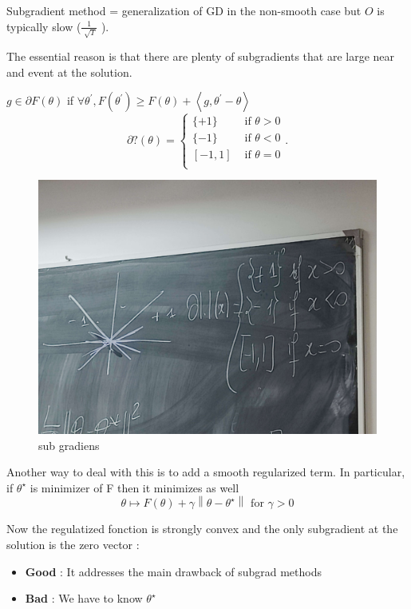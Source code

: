 \begin{note}
    Subgradient method = generalization of GD in the non-smooth case but $ O $ is typically slow ($ \frac{1}{\sqrt[]{T}} $ ). 

    The essential reason is that there are plenty of subgradients that are large near and event at the solution.

    $ g \in \partial F(\theta ) $ if $ \forall \theta ^\prime, F(\theta ^\prime ) \geq F(\theta ) +  \left\langle g, \theta ^\prime - \theta  \right\rangle $ 
    \[
        \partial ? (\theta ) = \begin{cases}
            \{ +1 \}  &\text{ if } \theta > 0\\
            \{ -1 \}  &\text{ if } \theta < 0\\
            [-1 , 1]  &\text{ if } \theta = 0\\
        \end{cases} 
    .\]
    
    \begin{figure}[!h]
        \centering
        \includegraphics[width=.65\textwidth]{figs/subgradients.jpg}
        \caption{sub gradiens}
        \label{truc}
    \end{figure}

    Another way to deal with this is to add a smooth regularized term. In particular, if $\theta ^{\star }$ is minimizer of F then it minimizes as well
    \[ \theta  \mapsto F(\theta) + \gamma \left\| \theta - \theta ^{\star } \right\| \text{ for } \gamma > 0  \]

    Now the regulatized fonction is strongly convex and the only subgradient at the solution is the zero vector : \begin{itemize}
        \item \textbf{Good} : It addresses the main drawback of subgrad methods
        \item \textbf{Bad} : We have to know $ \theta ^\star  $ 
    \end{itemize}


\end{note}

